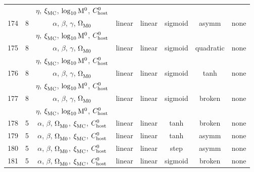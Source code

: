 \begin{longtable}{c c c c c c c c}
    \multicolumn{1}{c}{} & \multicolumn{1}{c}{} & $\eta$, $\xi_{\rm MC}^{}$, $\log_{10}^{}{\rm M}^0$, $C_{\rm host}^{0}$ & \multicolumn{1}{c}{} & \multicolumn{1}{c}{} & \multicolumn{1}{c}{} & \multicolumn{1}{c}{} & \multicolumn{1}{c}{} \\
    174 & 8 & $\alpha$, $\beta$, $\gamma$, $\Omega_{\rm M0}^{}$ & linear & linear & sigmoid & asymm & none \\
    \multicolumn{1}{c}{} & \multicolumn{1}{c}{} & $\eta$, $\xi_{\rm MC}^{}$, $\log_{10}^{}{\rm M}^0$, $C_{\rm host}^{0}$ & \multicolumn{1}{c}{} & \multicolumn{1}{c}{} & \multicolumn{1}{c}{} & \multicolumn{1}{c}{} & \multicolumn{1}{c}{} \\
    175 & 8 & $\alpha$, $\beta$, $\gamma$, $\Omega_{\rm M0}^{}$ & linear & linear & sigmoid & quadratic & none \\
    \multicolumn{1}{c}{} & \multicolumn{1}{c}{} & $\eta$, $\xi_{\rm MC}^{}$, $\log_{10}^{}{\rm M}^0$, $C_{\rm host}^{0}$ & \multicolumn{1}{c}{} & \multicolumn{1}{c}{} & \multicolumn{1}{c}{} & \multicolumn{1}{c}{} & \multicolumn{1}{c}{} \\
    176 & 8 & $\alpha$, $\beta$, $\gamma$, $\Omega_{\rm M0}^{}$ & linear & linear & sigmoid & tanh & none \\
    \multicolumn{1}{c}{} & \multicolumn{1}{c}{} & $\eta$, $\xi_{\rm MC}^{}$, $\log_{10}^{}{\rm M}^0$, $C_{\rm host}^{0}$ & \multicolumn{1}{c}{} & \multicolumn{1}{c}{} & \multicolumn{1}{c}{} & \multicolumn{1}{c}{} & \multicolumn{1}{c}{} \\
    177 & 8 & $\alpha$, $\beta$, $\gamma$, $\Omega_{\rm M0}^{}$ & linear & linear & sigmoid & broken & none \\
    \multicolumn{1}{c}{} & \multicolumn{1}{c}{} & $\eta$, $\xi_{\rm MC}^{}$, $\log_{10}^{}{\rm M}^0$, $C_{\rm host}^{0}$ & \multicolumn{1}{c}{} & \multicolumn{1}{c}{} & \multicolumn{1}{c}{} & \multicolumn{1}{c}{} & \multicolumn{1}{c}{} \\
    178 & 5 & $\alpha$, $\beta$, $\Omega_{\rm M0}^{}$, $\xi_{\rm MC}^{}$, $C_{\rm host}^{0}$ & linear & linear & tanh & broken & none \\
    179 & 5 & $\alpha$, $\beta$, $\Omega_{\rm M0}^{}$, $\xi_{\rm MC}^{}$, $C_{\rm host}^{0}$ & linear & linear & tanh & asymm & none \\
    180 & 5 & $\alpha$, $\beta$, $\Omega_{\rm M0}^{}$, $\xi_{\rm MC}^{}$, $C_{\rm host}^{0}$ & linear & linear & step & asymm & none \\
    181 & 5 & $\alpha$, $\beta$, $\Omega_{\rm M0}^{}$, $\xi_{\rm MC}^{}$, $C_{\rm host}^{0}$ & linear & linear & sigmoid & broken & none \\

\end{longtable}
